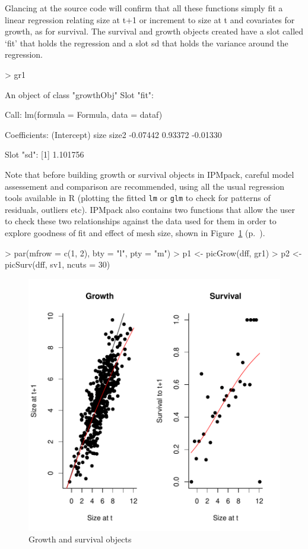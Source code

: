 \documentclass{article}
\begin{document}
Glancing at the source code will confirm that all these functions simply fit a linear regression relating size at t+1 or increment to size at t and covariates for growth, as for survival. The survival and growth objects created have a slot called `fit' that holds the regression and a slot sd that holds the variance around the regression. 
\begin{Schunk}
\begin{Sinput}
> gr1
\end{Sinput}
\begin{Soutput}
An object of class "growthObj"
Slot "fit":

Call:
lm(formula = Formula, data = dataf)

Coefficients:
(Intercept)         size        size2  
   -0.07442      0.93372     -0.01330  


Slot "sd":
[1] 1.101756
\end{Soutput}
\end{Schunk}
Note that before building growth or survival objects in IPMpack, careful model assessement and comparison are recommended, using all the usual regression tools available in R (plotting the fitted {\tt lm} or {\tt glm} to check for patterns of residuals, outliers etc). IPMpack also contains two functions that allow the user to check these two relationships against the data used for them in order to explore goodness of fit and effect of mesh size, shown in Figure~\ref{fig:one} (p.~\pageref{fig:one}).
\begin{Schunk}
\begin{Sinput}
> par(mfrow = c(1, 2), bty = "l", pty = "m")
> p1 <- picGrow(dff, gr1)
> p2 <- picSurv(dff, sv1, ncuts = 30)
\end{Sinput}
\end{Schunk}
\begin{figure}
\begin{center}
\includegraphics{IPMpack_vignette-fig1}
\end{center}
\caption{Growth and survival objects}
\label{fig:one}
\end{figure}
\end{document}
